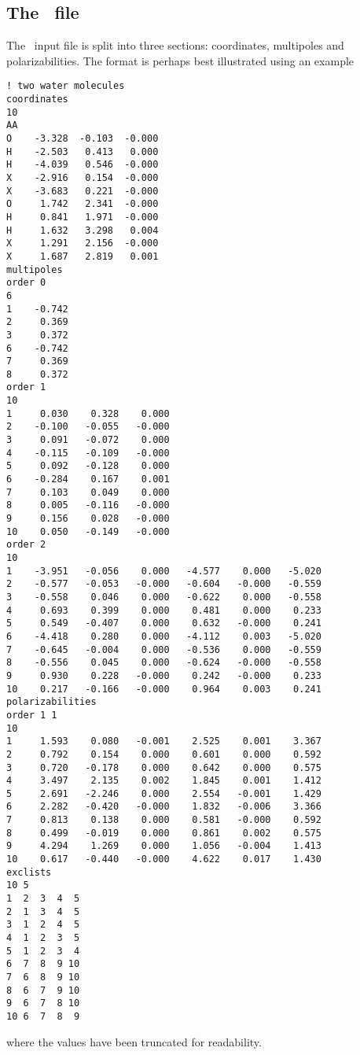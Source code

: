 \subsection*{The \potinp\ file}
The \potinp\ input file is split into three sections: coordinates, multipoles and polarizabilities. The format is perhaps best illustrated using an example
\begin{verbatim}
! two water molecules
coordinates
10
AA
O    -3.328  -0.103  -0.000
H    -2.503   0.413   0.000
H    -4.039   0.546  -0.000
X    -2.916   0.154  -0.000
X    -3.683   0.221  -0.000
O     1.742   2.341  -0.000
H     0.841   1.971  -0.000
H     1.632   3.298   0.004
X     1.291   2.156  -0.000
X     1.687   2.819   0.001
multipoles
order 0
6
1    -0.742
2     0.369
3     0.372
6    -0.742
7     0.369
8     0.372
order 1
10
1     0.030    0.328    0.000
2    -0.100   -0.055   -0.000
3     0.091   -0.072    0.000
4    -0.115   -0.109   -0.000
5     0.092   -0.128    0.000
6    -0.284    0.167    0.001
7     0.103    0.049    0.000
8     0.005   -0.116   -0.000
9     0.156    0.028   -0.000
10    0.050   -0.149   -0.000
order 2
10
1    -3.951   -0.056    0.000   -4.577    0.000   -5.020
2    -0.577   -0.053   -0.000   -0.604   -0.000   -0.559
3    -0.558    0.046    0.000   -0.622    0.000   -0.558
4     0.693    0.399    0.000    0.481    0.000    0.233
5     0.549   -0.407    0.000    0.632   -0.000    0.241
6    -4.418    0.280    0.000   -4.112    0.003   -5.020
7    -0.645   -0.004    0.000   -0.536    0.000   -0.559
8    -0.556    0.045    0.000   -0.624   -0.000   -0.558
9     0.930    0.228   -0.000    0.242   -0.000    0.233
10    0.217   -0.166   -0.000    0.964    0.003    0.241
polarizabilities
order 1 1
10
1     1.593    0.080   -0.001    2.525    0.001    3.367
2     0.792    0.154    0.000    0.601    0.000    0.592
3     0.720   -0.178    0.000    0.642    0.000    0.575
4     3.497    2.135    0.002    1.845    0.001    1.412
5     2.691   -2.246    0.000    2.554   -0.001    1.429
6     2.282   -0.420   -0.000    1.832   -0.006    3.366
7     0.813    0.138    0.000    0.581   -0.000    0.592
8     0.499   -0.019    0.000    0.861    0.002    0.575
9     4.294    1.269    0.000    1.056   -0.004    1.413
10    0.617   -0.440   -0.000    4.622    0.017    1.430
exclists
10 5
1  2  3  4  5
2  1  3  4  5
3  1  2  4  5
4  1  2  3  5
5  1  2  3  4
6  7  8  9 10
7  6  8  9 10
8  6  7  9 10
9  6  7  8 10
10 6  7  8  9
\end{verbatim}
where the values have been truncated for readability.

